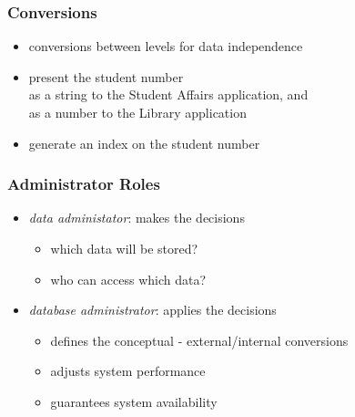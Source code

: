 \documentclass[dvipsnames]{beamer}
\theoremstyle{plain}
\begin{document}
\begin{frame}
  \frametitle{Conversions}

  \begin{itemize}
    \item conversions between levels for data independence
  \end{itemize}

  \pause
  \begin{example}
    \begin{itemize}
      \item present the student number\\
        as a string to the Student Affairs application, and\\
        as a number to the Library application
    \end{itemize}
  \end{example}

  \pause
  \begin{example}
    \begin{itemize}
      \item generate an index on the student number
    \end{itemize}
  \end{example}
\end{frame}

\begin{frame}
  \frametitle{Administrator Roles}

  \begin{itemize}
    \item \emph{data administator}: makes the decisions
    \begin{itemize}
      \item which data will be stored?
      \item who can access which data?
    \end{itemize}

    \pause
    \bigskip
    \item \emph{database administrator}: applies the decisions
    \begin{itemize}
      \item defines the conceptual - external/internal conversions
      \item adjusts system performance
      \item guarantees system availability
    \end{itemize}
  \end{itemize}
\end{frame}
\end{document}
